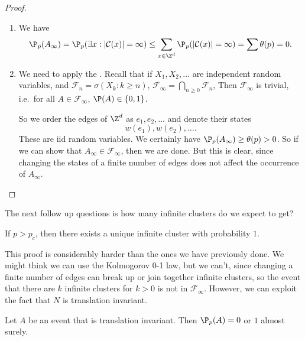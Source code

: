 \documentclass[a4paper]{article}
\begin{document}
\begin{proof}\leavevmode
  \begin{enumerate}
    \item We have
      \[
        \P_p(A_\infty) = \P_p(\exists x: |\mathcal{C}(x)| = \infty) \leq \sum_{x \in \Z^d} \P_p(|\mathcal{C}(x)| = \infty) = \sum \theta(p) = 0.
      \]
    \item We need to apply the . Recall that if $X_1, X_2, \ldots$ are independent random variables, and $\mathcal{F}_n = \sigma(X_k: k \geq n)$, $\mathcal{F}_\infty = \bigcap_{n \geq 0} \mathcal{F}_n$, Then $\mathcal{F}_\infty$ is trivial, i.e.\ for all $A \in \mathcal{F}_\infty$, $\P(A) \in \{0, 1\}$.

      So we order the edges of $\Z^d$ as $e_1, e_2, \ldots$ and denote their states
      \[
        w(e_1), w(e_2), \ldots.
      \]
      These are iid random variables. We certainly have $\P_p(A_\infty) \geq \theta(p) > 0$. So if we can show that $A_\infty \in \mathcal{F}_\infty$, then we are done. But this is clear, since changing the states of a finite number of edges does not affect the occurrence of $A_\infty$.\qedhere
  \end{enumerate}
\end{proof}

The next follow up questions is how many infinite clusters do we expect to get?
\begin{thm}
  If $p > p_c$, then there exists a unique infinite cluster with probability $1$.
\end{thm}
This proof is considerably harder than the ones we have previously done. We might think we can use the Kolmogorov 0-1 law, but we can't, since changing a finite number of edges can break up or join together infinite clusters, so the event that there are $k$ infinite clusters for $k > 0$ is not in $\mathcal{F}_\infty$. However, we can exploit the fact that $N$ is translation invariant.

\begin{ex}
  Let $A$ be an event that is translation invariant. Then $\P_p(A) = 0$ or $1$ almost surely. %
\end{ex}
\end{document}
